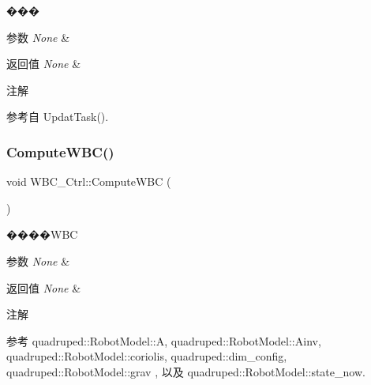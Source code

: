 ��� 


\begin{DoxyParams}{参数}
{\em None} & \\
\hline
\end{DoxyParams}

\begin{DoxyRetVals}{返回值}
{\em None} & \\
\hline
\end{DoxyRetVals}
\begin{DoxyNote}{注解}

\end{DoxyNote}


参考自 Updat\+Task().

\mbox{\label{classquadruped_1_1WBC__Ctrl_a32ecf21e6375af82593f87f75e2405e4}} 
\subsubsection{\texorpdfstring{Compute\+W\+B\+C()}{ComputeWBC()}}
{\footnotesize\ttfamily void W\+B\+C\+\_\+\+Ctrl\+::\+Compute\+W\+BC (\begin{DoxyParamCaption}\item[{void}]{ }\end{DoxyParamCaption})}



����\+W\+BC 


\begin{DoxyParams}{参数}
{\em None} & \\
\hline
\end{DoxyParams}

\begin{DoxyRetVals}{返回值}
{\em None} & \\
\hline
\end{DoxyRetVals}
\begin{DoxyNote}{注解}

\end{DoxyNote}


参考 quadruped\+::\+Robot\+Model\+::A, quadruped\+::\+Robot\+Model\+::\+Ainv, quadruped\+::\+Robot\+Model\+::coriolis, quadruped\+::dim\+\_\+config, quadruped\+::\+Robot\+Model\+::grav , 以及 quadruped\+::\+Robot\+Model\+::state\+\_\+now.



